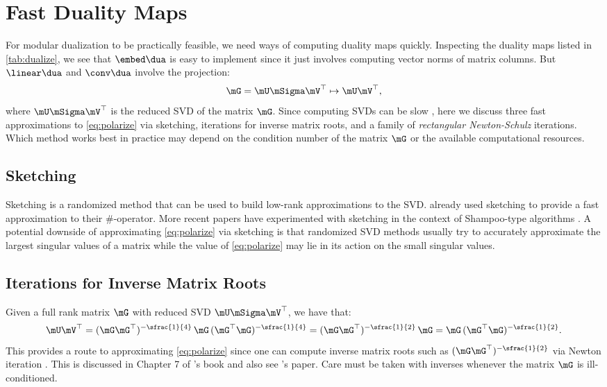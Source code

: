 
\section{Fast Duality Maps}
\label{sec:fast}

For modular dualization to be practically feasible, we need ways of computing duality maps quickly. Inspecting the duality maps listed in \cref{tab:dualize}, we see that $\embed\dua$ is easy to implement since it just involves computing vector norms of matrix columns. But $\linear\dua$ and $\conv\dua$ involve the projection:
\begin{equation}\label{eq:polarize}
    \mG = \mU\mSigma \mV^\top \mapsto \mU\mV^\top,
\end{equation}
where $\mU\mSigma \mV^\top$ is the reduced SVD of the matrix $\mG$. Since computing SVDs can be slow \citep{spectral-descent-4,flynn2017duality}, here we discuss three fast approximations to \cref{eq:polarize} via sketching, iterations for inverse matrix roots, and a family of \textit{rectangular Newton-Schulz} iterations. Which method works best in practice may depend on the condition number of the matrix $\mG$ or the available computational resources.

\subsection{Sketching}

Sketching is a randomized method \citep{Martinsson_Tropp_2020} that can be used to build low-rank approximations to the SVD. \citet{spectral-descent-4} already used sketching to provide a fast approximation to their $\#$-operator. More recent papers have experimented with sketching in the context of Shampoo-type algorithms \citep{sketchy}. A potential downside of approximating \cref{eq:polarize} via sketching is that randomized SVD methods usually try to accurately approximate the largest singular values of a matrix \citep[Section 11.2]{Martinsson_Tropp_2020} while the value of \cref{eq:polarize} may lie in its action on the small singular values.

\subsection{Iterations for Inverse Matrix Roots}

Given a full rank matrix $\mG$ with reduced SVD $\mU\mSigma\mV^\top$, we have that:
\begin{equation}
    \mU\mV^\top = (\mG\mG^\top)^{-\sfrac{1}{4}} \,\mG\, (\mG^\top\mG)^{-\sfrac{1}{4}} = (\mG\mG^\top)^{-\sfrac{1}{2}} \,\mG = \mG\, (\mG^\top\mG)^{-\sfrac{1}{2}}.
\end{equation}
This provides a route to approximating \cref{eq:polarize} since one can compute inverse matrix roots such as $(\mG\mG^\top)^{-\sfrac{1}{2}}$ via Newton iteration \citep{lakic}. This is discussed in Chapter 7 of \citet{higham}'s book and also see \citet{Anil2020ScalableSecondOrder}'s paper. Care must be taken with inverses whenever the matrix $\mG$ is ill-conditioned.

